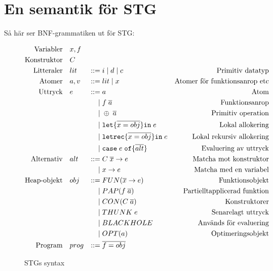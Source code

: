 \documentclass[../Core]{subfiles}
\begin{document}
\section{En semantik för STG}
\label{sec:SemStg}






Så här ser BNF-grammatiken ut för STG:

\begin{figure}[H]
\begin{equation*}
\begin{aligned}
\text{Variabler} \quad & x,f \\
\text{Konstruktor} \quad & C \\
\text{Litteraler}\quad&lit&::=&\;i \; | \;  d \;|\; c&\text{Primitiv datatyp} \\
\text{Atomer}\quad&a, v&::=&\;lit \; | \; x&\text{Atomer för funktionsanrop etc} \\
\text{Uttryck}\quad&e&::=&\;a&\text{Atom} \\
    &&|&\;f \; \overline{a}&\text{Funktionsanrop} \\
    &&|&\;\oplus \; \overline{a}&\text{Primitiv operation} \\
    &&|&\;\mathtt{let \{} \overline{x = obj} \mathtt{ \} in } \; e&\text{Lokal allokering} \\
    &&|&\;\mathtt{letrec \{} \overline{x = obj} \mathtt{ \} in } \; e&\text{Lokal rekursiv allokering} \\
    &&|&\;\mathtt{case} \; e \;  \mathtt{ of \{ } \overline{alt} \mathtt{\}}&\text{Evaluering av uttryck} \\
\text{Alternativ}\quad&alt&::=&\;C \; \overline{x} \rightarrow e&\text{Matcha mot konstruktor} \\
    &&|&\;x \rightarrow e&\text{Matcha med en variabel} \\
\text{Heap-objekt}\quad&obj&::=&\;FUN(\overline{x} \rightarrow e)&\text{Funktionsobjekt} \\
    &&|&\;PAP(f \; \overline{a})&\text{Partielltapplicerad funktion} \\
    &&|&\;CON(C \; \overline{a})&\text{Konstruktorer} \\
    &&|&\;THUNK \; e&\text{Senarelagt uttryck} \\
    &&|&\;BLACKHOLE&\text{Används för evaluering} \\
    &&|&\;OPT(a)&\text{Optimeringsobjekt} \\
\text{Program}\quad&prog&::=&\;\overline{f=obj}&\text{}
\end{aligned}
\end{equation*}
\caption{STGs syntax}
\end{figure}
\end{document}
